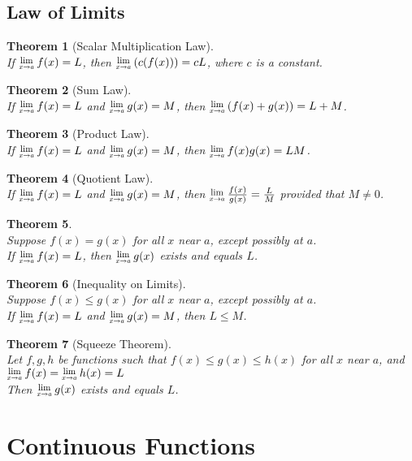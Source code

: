 \documentclass[12pt]{article}
\newcommand{\Lim}[1]{\raisebox{0.5ex}{\scalebox{0.8}{$\displaystyle \lim_{#1}\;$}}}
\newtheorem{theorem}{Theorem}[section]
\theoremstyle{definition}
\begin{document}
\subsection{Law of Limits}
\begin{theorem}[Scalar Multiplication Law]
\hfill\\
\normalfont If $\Lim{x\to a}f(x)=L$, then $\Lim{x\to a} (c(f(x)))=cL$, where $c$ is a constant.
\end{theorem}
\begin{theorem}[Sum Law]
\hfill\\
\normalfont If $\Lim{x\to a}f(x)=L$ and $\Lim{x\to a}g(x)=M$, then $\Lim{x\to a}(f(x)+g(x))=L+M$.
\end{theorem}
\begin{theorem}[Product Law]
\hfill\\
\normalfont If $\Lim{x\to a}f(x)=L$ and $\Lim{x\to a}g(x)=M$, then $\Lim{x\to a}f(x)g(x)=LM$.
\end{theorem}
\begin{theorem}[Quotient Law]
\hfill\\
\normalfont If $\Lim{x\to a}f(x)=L$ and $\Lim{x\to a}g(x)=M$, then $\Lim{x\to a}\frac{f(x)}{g(x)}=\frac{L}{M}$ provided that $M\neq 0$.
\end{theorem}
\begin{theorem}
\hfill\\
\normalfont Suppose $f(x)=g(x)$ for all $x$ near $a$, except possibly at $a$.\\
If $\Lim{x\to a}f(x)=L$, then $\Lim{x\to a}g(x)$ exists and equals $L$.
\end{theorem}
\begin{theorem}[Inequality on Limits]
\hfill\\
\normalfont Suppose $f(x)\leq g(x)$ for all $x$ near $a$, except possibly at $a$.\\
If $\Lim{x\to a}f(x)=L$ and $\Lim{x\to a}g(x)=M$, then $L\leq M$.
\end{theorem}
\begin{theorem}[Squeeze Theorem]
\hfill\\
\normalfont Let $f,g,h$ be functions such that $f(x)\leq g(x)\leq h(x)$ for all $x$ near $a$, and $\Lim{x\to a}f(x)=\Lim{x\to a}h(x)=L$\\
Then $\Lim{x\to a}g(x)$ exists and equals $L$.
\end{theorem}
\clearpage
\section{Continuous Functions}
\end{document}
